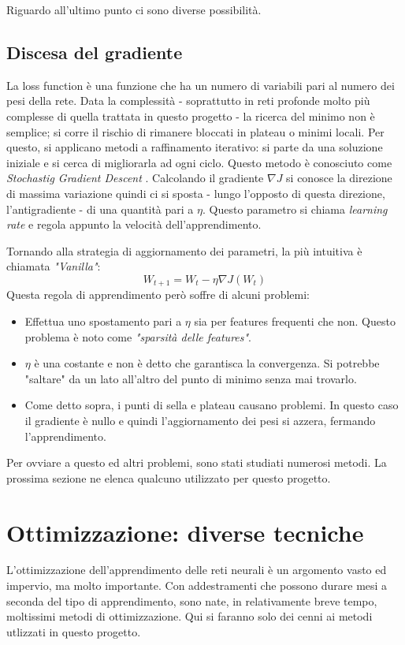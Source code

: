 Riguardo all'ultimo punto ci sono diverse possibilità. 
\subsection{Discesa del gradiente}
La loss function è una funzione che ha un numero di variabili pari al numero dei pesi della rete. Data la complessità - soprattutto in reti profonde molto più complesse di quella trattata in questo progetto - la ricerca del minimo non è semplice; si corre il rischio di rimanere bloccati in plateau o minimi locali. Per questo, si applicano metodi a raffinamento iterativo: si parte da una soluzione iniziale e si cerca di migliorarla ad ogni ciclo. Questo metodo è conosciuto come \emph{Stochastig Gradient Descent} \parencite{WSGD}.
Calcolando il gradiente $\nabla J$ si conosce la direzione di massima variazione quindi ci si sposta - lungo l'opposto di questa direzione, l'antigradiente - di una quantità pari a $\eta$. Questo parametro si chiama \emph{learning rate} e regola appunto la velocità dell'apprendimento. 

Tornando alla strategia di aggiornamento dei parametri, la più intuitiva è chiamata \emph{"Vanilla"}: 
\begin{equation}
W_{t+1} = W_{t} - \eta \nabla J(W_t)
\end{equation}
Questa regola di apprendimento però soffre di alcuni problemi: 
\begin{itemize}
\item Effettua uno spostamento pari a $\eta$ sia per features frequenti che non. Questo problema è noto come \emph{"sparsità delle features"}.
\item $\eta$ è una costante e non è detto che garantisca la convergenza. Si potrebbe "saltare" da un lato all'altro del punto di minimo senza mai trovarlo. 
\item Come detto sopra, i punti di sella e plateau causano problemi. In questo caso il gradiente è nullo e quindi l'aggiornamento dei pesi si azzera, fermando l'apprendimento. 
\end{itemize}

Per ovviare a questo ed altri problemi, sono stati studiati numerosi metodi. La prossima sezione ne elenca qualcuno utilizzato per questo progetto. 

\section{Ottimizzazione: diverse tecniche}
L'ottimizzazione dell'apprendimento delle reti neurali è un argomento vasto ed impervio, ma molto importante. Con addestramenti che possono durare mesi a seconda del tipo di apprendimento, sono nate, in relativamente breve tempo, moltissimi metodi di ottimizzazione. Qui si faranno solo dei cenni ai metodi utlizzati in questo progetto. 

